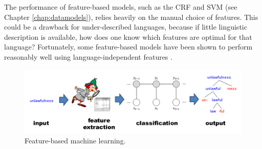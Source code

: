 The performance of feature-based models, such as the CRF and SVM (see Chapter \ref{chap:datamodels}), relies heavily on the manual choice of features. This could be a drawback for under-described languages, because if little linguistic description is available, how does one know which features are optimal for that language? Fortunately, some feature-based models have been shown to perform reasonably well using language-independent features \citep{ruokolainen_comparative_2016,moeller_automatic_2018}.  

\begin{figure}[t]
\label{fig:Features-ML}
\begin{center}
\includegraphics[width=0.95\columnwidth]{figs/Features-ML.PNG}
\caption[Feature-based machine learning]{Feature-based machine learning.}
\end{center}
\end{figure}


